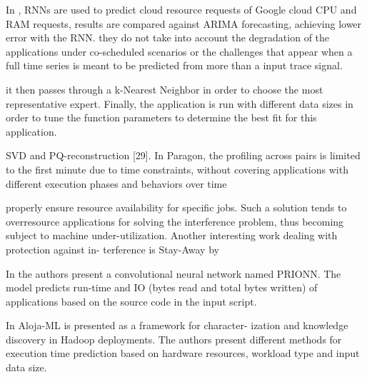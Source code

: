 \documentclass[UTF8]{article}
\begin{document}
    In \cite{zhang2016workload}, RNNs are used to predict cloud resource requests of Google cloud CPU and RAM requests, results are compared against ARIMA forecasting, achieving lower error with the RNN. they do not take into account the degradation of the applications under co-scheduled scenarios or the challenges that appear when a full time series is meant to be predicted from more than a input trace signal.
    
    \cite{marco2017improving} it then passes through a k-Nearest Neighbor in order to choose the most representative expert. Finally, the application is run with different data sizes in order to tune the function parameters to determine the best fit for this application. 
    
    SVD and PQ-reconstruction [29]. In Paragon, the profiling across pairs is limited to the first minute due to time constraints, without covering applications with different execution phases and behaviors over time
    
    properly ensure resource availability for specific jobs. Such a solution tends to overresource applications for solving the interference problem, thus becoming subject to machine under-utilization. Another interesting work dealing with protection against in- terference is Stay-Away by \cite{rameshan2014stay}
    
    In \cite{wyatt2018prionn} the authors present a convolutional neural network named PRIONN. The model predicts run-time and IO (bytes read and total bytes written) of applications based on the source code in the input script. 
    
    In \cite{berral2015aloja} Aloja-ML is presented as a framework for character- ization and knowledge discovery in Hadoop deployments. The authors present different methods for execution time prediction based on hardware resources, workload type and input data size.
    
\end{document}
